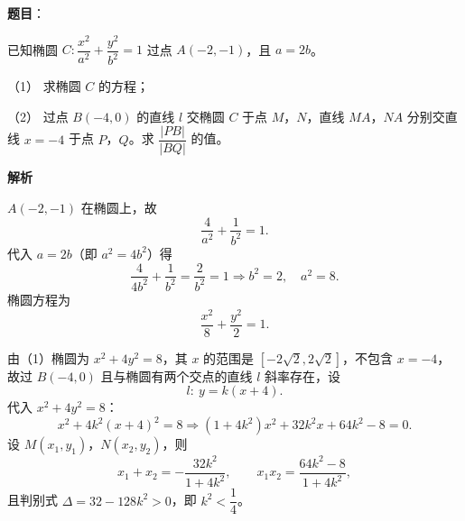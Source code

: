 \begin{answer}

\textbf{题目}：

已知椭圆 $C:\dfrac{x^2}{a^2}+\dfrac{y^2}{b^2}=1$ 过点 $A(-2,-1)$，且 $a=2b$。

（1） 求椭圆 $C$ 的方程；

（2） 过点 $B(-4,0)$ 的直线 $l$ 交椭圆 $C$ 于点 $M$，$N$，直线 $MA$，$NA$ 分别交直线 $x=-4$ 于点 $P$，$Q$。求 $\dfrac{|PB|}{|BQ|}$ 的值。

\textbf{解析}


$A(-2,-1)$ 在椭圆上，故
\nopagebreak[4]
\[\frac{4}{a^2}+\frac1{b^2}=1 .\]
代入 $a=2b$（即 $a^2=4b^2$）得
\nopagebreak[4]
\[\frac4{4b^2}+\frac1{b^2}=\frac2{b^2}=1\Longrightarrow b^2=2,\quad a^2=8 .\]
椭圆方程为
\nopagebreak[4]
\[\frac{x^2}8+\frac{y^2}2=1 .\]


由（1）椭圆为 $x^2+4y^2=8$，其 $x$ 的范围是 $[-2\sqrt2,2\sqrt2]$，不包含 $x=-4$，故过 $B(-4,0)$ 且与椭圆有两个交点的直线 $l$ 斜率存在，设
\nopagebreak[4]
\[l:\ y=k(x+4).\]
代入 $x^2+4y^2=8$：
\nopagebreak[4]
\[x^2+4k^2(x+4)^2=8\Longrightarrow\left(1+4k^2\right)x^2+32k^2x+64k^2-8=0 .\]
设 $M(x_1,y_1)$，$N(x_2,y_2)$，则
\nopagebreak[4]
\[x_1+x_2=-\frac{32k^2}{1+4k^2},\qquad x_1x_2=\frac{64k^2-8}{1+4k^2},\]
且判别式 $\Delta=32-128k^2>0$，即 $k^2<\dfrac14$。


\end{answer}
